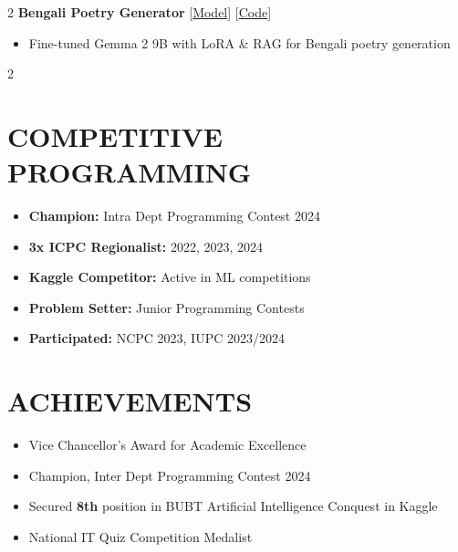 \documentclass[a4paper,10pt]{article}
\begin{document}
\begin{multicols}{2}
\textbf{Bengali Poetry Generator} \hfill [\href{https://huggingface.co/samim-reza/KobitaLM}{\color{maincolor}Model}] [\href{https://github.com/samim-reza/KobitaLM}{\color{maincolor}Code}]
\begin{itemize}
    \item Fine-tuned Gemma 2 9B with LoRA \& RAG for Bengali poetry generation
\end{itemize}

\end{multicols}

\begin{multicols}{2}
\section*{COMPETITIVE PROGRAMMING}
\begin{itemize}
    \item \textbf{Champion:} Intra Dept Programming Contest 2024
    \item \textbf{3x ICPC Regionalist:} 2022, 2023, 2024
    \item \textbf{Kaggle Competitor:} Active in ML competitions
    \item \textbf{Problem Setter:} Junior Programming Contests
    \item \textbf{Participated:} NCPC 2023, IUPC 2023/2024
\end{itemize}
\columnbreak
\section*{ACHIEVEMENTS}
\begin{itemize}
    \item Vice Chancellor's Award for Academic Excellence
    \item Champion, Inter Dept Programming Contest 2024
    \item Secured \textbf{8th} position in BUBT Artificial Intelligence Conquest in Kaggle
    \item National IT Quiz Competition Medalist
\end{itemize}
\end{multicols}
\end{document}
